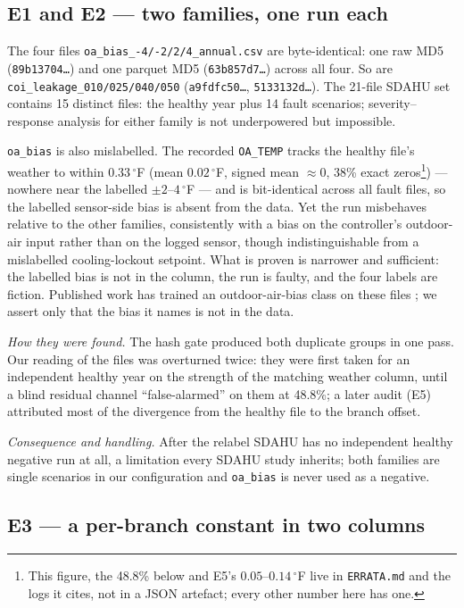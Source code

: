 \documentclass[runningheads]{llncs}
\begin{document}
\subsection{E1 and E2 --- two families, one run each}

The four files \texttt{oa\_bias\_-4/-2/2/4\_annual.csv} are byte-identical: one raw MD5 (\texttt{89b13704\ldots}) and one parquet MD5 (\texttt{63b857d7\ldots}) across all four. So are \texttt{coi\_leakage\_010/025/040/050} (\texttt{a9fdfc50\ldots}, \texttt{5133132d\ldots}). The 21-file SDAHU set contains 15 distinct files: the healthy year plus 14 fault scenarios; severity--response analysis for either family is not underpowered but impossible.

\texttt{oa\_bias} is also mislabelled. The recorded \texttt{OA\_TEMP} tracks the healthy file's weather to within $0.33\,^\circ$F (mean $0.02\,^\circ$F, signed mean $\approx 0$, 38\% exact zeros\footnote{This figure, the 48.8\% below and E5's $0.05$--$0.14\,^\circ$F live in \texttt{ERRATA.md} and the logs it cites, not in a JSON artefact; every other number here has one.}) --- nowhere near the labelled $\pm 2$--$4\,^\circ$F --- and is bit-identical across all fault files, so the labelled sensor-side bias is absent from the data. Yet the run misbehaves relative to the other families, consistently with a bias on the controller's outdoor-air input rather than on the logged sensor, though indistinguishable from a mislabelled cooling-lockout setpoint. What is proven is narrower and sufficient: the labelled bias is not in the column, the run is faulty, and the four labels are fiction. Published work has trained an outdoor-air-bias class on these files \cite{deng2024afgcn}; we assert only that the bias it names is not in the data.

\emph{How they were found.} The hash gate produced both duplicate groups in one pass. Our reading of the files was overturned twice: they were first taken for an independent healthy year on the strength of the matching weather column, until a blind residual channel ``false-alarmed'' on them at 48.8\%; a later audit (E5) attributed most of the divergence from the healthy file to the branch offset.

\emph{Consequence and handling.} After the relabel SDAHU has no independent healthy negative run at all, a limitation every SDAHU study inherits; both families are single scenarios in our configuration and \texttt{oa\_bias} is never used as a negative.


\subsection{E3 --- a per-branch constant in two columns}
\end{document}
